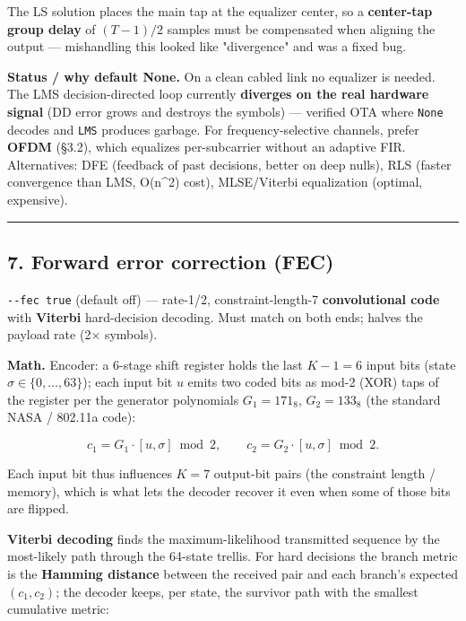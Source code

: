 \documentclass[
  10pt,
]{article}
\begin{document}
The LS solution places the main tap at the equalizer center, so a
\textbf{center-tap group delay} of \((T-1)/2\) samples must be
compensated when aligning the output --- mishandling this looked like
"divergence" and was a fixed bug.

\textbf{Status / why default None.} On a clean cabled link no equalizer
is needed. The LMS decision-directed loop currently \textbf{diverges on
the real hardware signal} (DD error grows and destroys the symbols) ---
verified OTA where \texttt{None} decodes and \texttt{LMS} produces
garbage. For frequency-selective channels, prefer \textbf{OFDM} (§3.2),
which equalizes per-subcarrier without an adaptive FIR. Alternatives:
DFE (feedback of past decisions, better on deep nulls), RLS (faster
convergence than LMS, O(n\^{}2) cost), MLSE/Viterbi equalization
(optimal, expensive).

\begin{center}\rule{0.5\linewidth}{0.5pt}\end{center}

\hypertarget{7-forward-error-correction-fec}{%
\subsection{7. Forward error correction
(FEC)}\label{7-forward-error-correction-fec}}

\texttt{-\/-fec\ true} (default off) --- rate-1/2, constraint-length-7
\textbf{convolutional code} with \textbf{Viterbi} hard-decision
decoding. Must match on both ends; halves the payload rate (2× symbols).

\textbf{Math.} Encoder: a 6-stage shift register holds the last
\(K-1 = 6\) input bits (state \(\sigma \in \{0,\dots,63\}\)); each input
bit \(u\) emits two coded bits as mod-2 (XOR) taps of the register per
the generator polynomials \(G_1 = 171_8\), \(G_2 = 133_8\) (the standard
NASA / 802.11a code):

\[ c_1 = G_1 \cdot [u,\sigma] \bmod 2, \qquad c_2 = G_2 \cdot [u,\sigma] \bmod 2. \]

Each input bit thus influences \(K = 7\) output-bit pairs (the
constraint length / memory), which is what lets the decoder recover it
even when some of those bits are flipped.

\textbf{Viterbi decoding} finds the maximum-likelihood transmitted
sequence by the most-likely path through the 64-state trellis. For hard
decisions the branch metric is the \textbf{Hamming distance} between the
received pair and each branch's expected \((c_1,c_2)\); the decoder
keeps, per state, the survivor path with the smallest cumulative metric:
\end{document}
